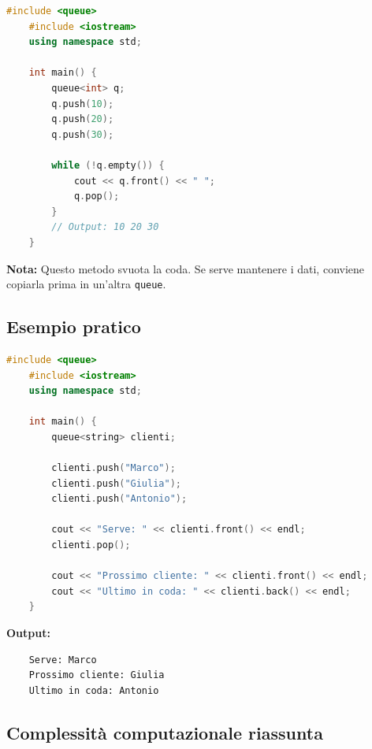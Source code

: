 \begin{lstlisting}[language=C++]
	#include <queue>
	#include <iostream>
	using namespace std;
	
	int main() {
		queue<int> q;
		q.push(10);
		q.push(20);
		q.push(30);
		
		while (!q.empty()) {
			cout << q.front() << " ";
			q.pop();
		}
		// Output: 10 20 30
	}
\end{lstlisting}

\textbf{Nota:}  
Questo metodo svuota la coda. Se serve mantenere i dati, conviene copiarla prima in un’altra \texttt{queue}.

\subsection{Esempio pratico}

\begin{lstlisting}[language=C++]
	#include <queue>
	#include <iostream>
	using namespace std;
	
	int main() {
		queue<string> clienti;
		
		clienti.push("Marco");
		clienti.push("Giulia");
		clienti.push("Antonio");
		
		cout << "Serve: " << clienti.front() << endl;
		clienti.pop();
		
		cout << "Prossimo cliente: " << clienti.front() << endl;
		cout << "Ultimo in coda: " << clienti.back() << endl;
	}
\end{lstlisting}

\textbf{Output:}
\begin{verbatim}
	Serve: Marco
	Prossimo cliente: Giulia
	Ultimo in coda: Antonio
\end{verbatim}

\subsection{Complessità computazionale riassunta}

